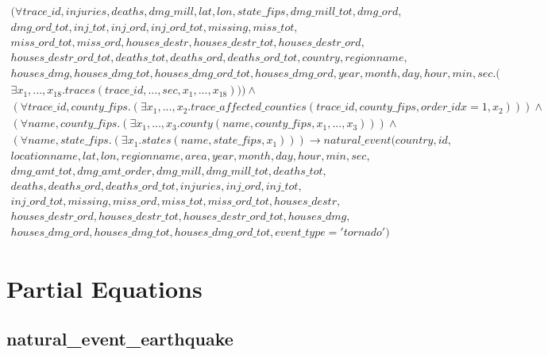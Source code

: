 \documentclass{article}
\begin{document}
\begin{multline}
(\forall trace\_id, injuries, deaths, dmg\_mill, lat, lon, state\_fips, dmg\_mill\_tot, dmg\_ord,\\  dmg\_ord\_tot, inj\_tot, inj\_ord, inj\_ord\_tot, missing, miss\_tot, \\ miss\_ord\_tot, miss\_ord, houses\_destr, houses\_destr\_tot, houses\_destr\_ord, \\ houses\_destr\_ord\_tot, deaths\_tot, deaths\_ord, deaths\_ord\_tot, country, regionname, \\ houses\_dmg, houses\_dmg\_tot, houses\_dmg\_ord\_tot, houses\_dmg\_ord, year, month, day, hour, min, sec.( \\
\exists x_1, ..., x_{18}. traces(trace\_id, ..., sec, x_1, ..., x_{18})))  \wedge \\ 
(\forall trace\_id, county\_fips.(
\exists x_1, ..., x_{2}. trace\_affected\_counties(trace\_id, county\_fips, order\_idx=1, x_{2})))
 \wedge \\ (
 \forall name, county\_fips.(
\exists x_1, ..., x_{3}. county(name, county\_fips, x_1, ..., x_{3}))
 ) \wedge \\ (
\forall name, state\_fips.(
\exists x_1. states( name, state\_fips, x_1))
 ) \longrightarrow natural\_event(country, id, \\ locationname, lat, lon,  regionname, area, year, month, day, hour, min, sec, \\ dmg\_amt\_tot, dmg\_amt\_order, dmg\_mill, dmg\_mill\_tot, deaths\_tot, \\ deaths, deaths\_ord, deaths\_ord\_tot, injuries, inj\_ord, inj\_tot, \\ inj\_ord\_tot, missing, miss\_ord, miss\_tot, miss\_ord\_tot, houses\_destr, \\ houses\_destr\_ord, houses\_destr\_tot, houses\_destr\_ord\_tot, houses\_dmg, \\ houses\_dmg\_ord, houses\_dmg\_tot, houses\_dmg\_ord\_tot, event\_type =  'tornado')
\end{multline} 

\section{Partial Equations}

\subsection{natural\_event\_earthquake}
\end{document}
